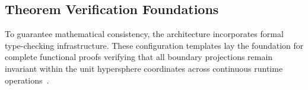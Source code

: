 \subsection{Theorem Verification Foundations}

To guarantee mathematical consistency, the architecture incorporates formal type-checking infrastructure. These configuration templates lay the foundation for complete functional proofs verifying that all boundary projections remain invariant within the unit hypersphere coordinates across continuous runtime operations~\cite{moura2021lean}.
